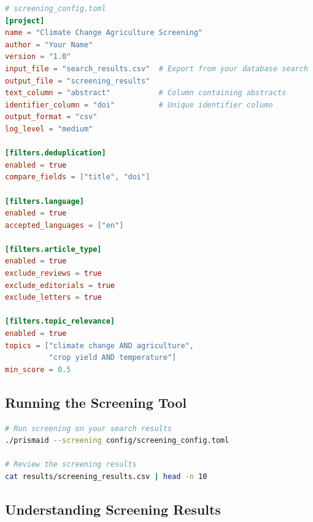 \begin{configbox}
\begin{lstlisting}[language=TOML]
# screening_config.toml
[project]
name = "Climate Change Agriculture Screening"
author = "Your Name"
version = "1.0"
input_file = "search_results.csv"  # Export from your database search
output_file = "screening_results"
text_column = "abstract"           # Column containing abstracts
identifier_column = "doi"          # Unique identifier column
output_format = "csv"
log_level = "medium"

[filters.deduplication]
enabled = true
compare_fields = ["title", "doi"]

[filters.language]
enabled = true
accepted_languages = ["en"]

[filters.article_type]
enabled = true
exclude_reviews = true
exclude_editorials = true
exclude_letters = true

[filters.topic_relevance]
enabled = true
topics = ["climate change AND agriculture",
          "crop yield AND temperature"]
min_score = 0.5
\end{lstlisting}
\end{configbox}

\subsection{Running the Screening Tool}

\begin{commandbox}
\begin{lstlisting}[language=Bash]
# Run screening on your search results
./prismaid --screening config/screening_config.toml

# Review the screening results
cat results/screening_results.csv | head -n 10
\end{lstlisting}
\end{commandbox}



\subsection{Understanding Screening Results}

